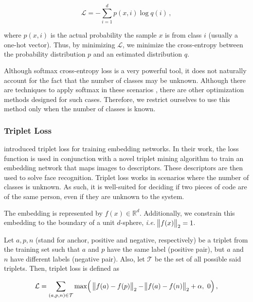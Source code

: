 \begin{equation}
\mathcal{L} = -\sum_{i=1}^d p(x, i) \log q(i) \,,
\end{equation}

where $p(x, i)$ is the actual probability the sample $x$ is from class $i$ (usually a one-hot vector). Thus, by minimizing $\mathcal{L}$, we minimize the cross-entropy between the probability distribution $p$ and an estimated distribution $q$.

Although softmax cross-entropy loss is a very powerful tool, it does not naturally account for the fact that the number of classes may be unknown. Although there are techniques to apply softmax in these scenarios \cite{softmax_trick1,softmax_trick2}, there are other optimization methods designed for such cases. Therefore, we restrict ourselves to use this method only when the number of classes is known.

\subsubsection{Triplet Loss}\label{sec:triplet}

 introduced triplet loss for training embedding networks. In their work, the loss function is used in conjunction with a novel triplet mining algorithm to train an embedding network that maps images to descriptors. These descriptors are then used to solve face recognition. Triplet loss works in scenarios where the number of classes is unknown. As such, it is well-suited for deciding if two pieces of code are of the same person, even if they are unknown to the system.

The embedding is represented by $f(x) \in \mathbb{R}^d$. Additionally, we constrain this embedding to the boundary of a unit $d$-sphere, \textit{i.e.} $\norm{f(x)}_2 = 1$.

Let $a, p, n$ (stand for anchor, positive and negative, respectively) be a triplet from the training set such that $a$ and $p$ have the same label (positive pair), but $a$ and $n$ have different labels (negative pair). Also, let $\mathcal{T}$ be the set of all possible said triplets. Then, triplet loss is defined as

\begin{equation}\label{eq:triplet}
\mathcal{L} = \sum_{(a, p, n) \in \mathcal{T}} %
\max\Bigl(\ \norm{f(a) - f(p)}_2 - \norm{f(a) - f(n)}_2 + \alpha,\ 0\Bigr)\,,
\end{equation}

